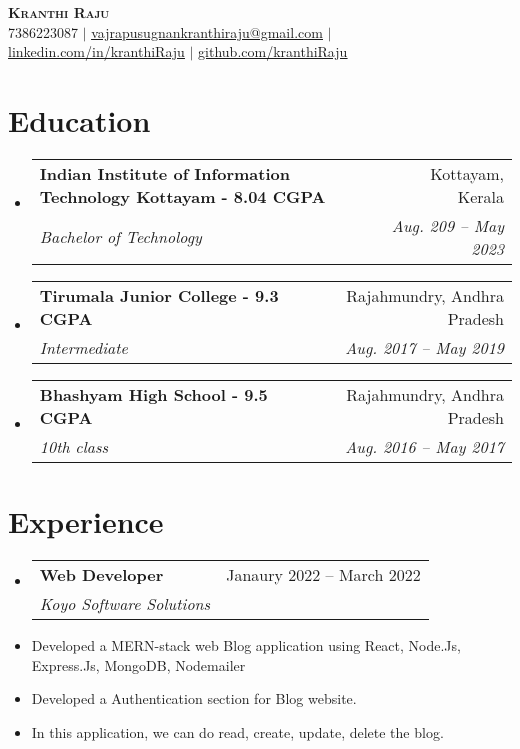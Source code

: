 \documentclass[letterpaper,11pt]{article}
\makeatletter
\newcommand{\resumeItem}[1]{
  \item\small{
    {#1 \vspace{-2pt}}
  }
}
\newcommand{\resumeSubheading}[4]{
  \vspace{-2pt}\item
    \begin{tabular*}{0.97\textwidth}[t]{l@{\extracolsep{\fill}}r}
      \textbf{#1} & #2 \\
      \textit{\small#3} & \textit{\small #4} \\
    \end{tabular*}\vspace{-7pt}
}
\newcommand{\resumeSubHeadingListStart}{\begin{itemize}[leftmargin=0.15in, label={}]}
\newcommand{\resumeSubHeadingListEnd}{\end{itemize}}
\newcommand{\resumeItemListStart}{\begin{itemize}}
\newcommand{\resumeItemListEnd}{\end{itemize}\vspace{-5pt}}
\makeatother
\begin{document}

\begin{center}
    \textbf{\Huge \scshape Kranthi Raju} \\ \vspace{1pt}
    \small 7386223087 $|$ \href{mailto:vajrapusugnankranthiraju@gmail.com}{\underline{vajrapusugnankranthiraju@gmail.com}} $|$ 
    \href{https://linkedin.com/in/...}{\underline{linkedin.com/in/kranthiRaju}} $|$
    \href{https://github.com/...}{\underline{github.com/kranthiRaju}}
\end{center}


\section{Education}
  \resumeSubHeadingListStart
    \resumeSubheading
      {Indian Institute of Information Technology Kottayam - 8.04 CGPA}{Kottayam, Kerala}
      {Bachelor of Technology}{Aug. 209 -- May 2023}
    \resumeSubheading
      {Tirumala Junior College - 9.3 CGPA}{Rajahmundry, Andhra Pradesh}
      {Intermediate}{Aug. 2017 -- May 2019}
    \resumeSubheading
      {Bhashyam High School - 9.5 CGPA}{Rajahmundry, Andhra Pradesh}
      {10th class}{Aug. 2016 -- May 2017}
  \resumeSubHeadingListEnd


\section{Experience}
  \resumeSubHeadingListStart

    \resumeSubheading
      {Web Developer}{Janaury 2022 -- March 2022}
      {Koyo Software Solutions}
      \resumeItemListStart
        \resumeItem{Developed a MERN-stack web Blog application using React, Node.Js, Express.Js, MongoDB, Nodemailer}
        \resumeItem{Developed a Authentication section for Blog website.}
        \resumeItem{In this application, we can do read, create, update, delete the blog.}
      \resumeItemListEnd
      
\end{document}
